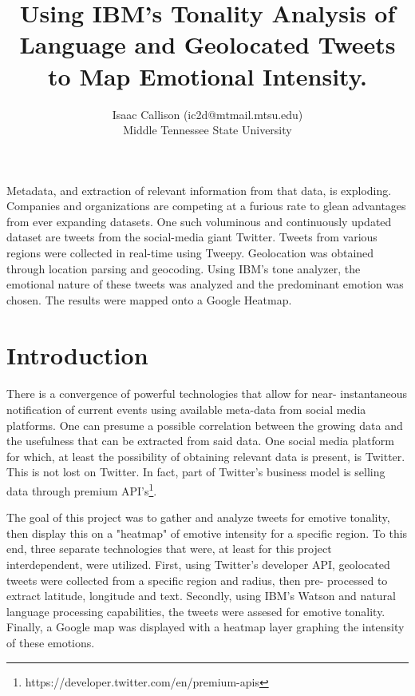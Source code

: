 \documentclass[12pt, oneside]{article}
\title{Using IBM's Tonality Analysis of Language and Geolocated Tweets to Map Emotional Intensity.
\\\medskip}
\author{Isaac Callison (ic2d@mtmail.mtsu.edu)\\Middle Tennessee State University}
\begin{document}
\maketitle
\nocite{*}
\newpage{}


\renewenvironment{abstract}
 {\small
  \begin{center}
  \bfseries \abstractname\vspace{-.5em}\vspace{0pt}
  \end{center}
  \list{}{
    \setlength{\leftmargin}{.8cm}%
    \setlength{\rightmargin}{\leftmargin}%
  }%
  \item\relax}
 {\endlist}

\begin{abstract}
Metadata, and extraction of relevant information from that data, is exploding.
Companies and organizations are competing at a furious rate to glean advantages
from ever expanding datasets. One such voluminous and continuously updated
dataset are tweets from the social-media giant Twitter. Tweets from various
regions were collected in real-time using Tweepy. Geolocation was obtained
through location parsing and geocoding. Using IBM's tone analyzer, the
emotional nature of these tweets was analyzed and the predominant emotion was
chosen. The results were mapped onto a Google Heatmap.
\end{abstract}



\section{Introduction}
\paragraph{}
There is a convergence of powerful technologies that allow for near-
instantaneous notification of current events using available meta-data from
social media platforms. One can presume a possible correlation between the
growing data and the usefulness that can be extracted from said data. One
social media platform for which, at least the
possibility of obtaining relevant data is present, is Twitter. This is not lost
on Twitter. In fact, part of Twitter's business model is selling data through
premium API's\footnote{https://developer.twitter.com/en/premium-apis}.

The goal of this project was to gather and analyze tweets for emotive tonality,
then display this on a "heatmap" of emotive intensity for a specific
region. To this end, three separate technologies that were, at least for this
project interdependent, were utilized. First, using Twitter's developer API,
geolocated tweets were collected from a specific region and radius, then pre-
processed to extract latitude, longitude and text. Secondly, using IBM's
Watson and natural language processing capabilities, the tweets were assesed
for emotive tonality. Finally, a Google map was
displayed with a heatmap layer graphing the intensity of these emotions.
\end{document}
